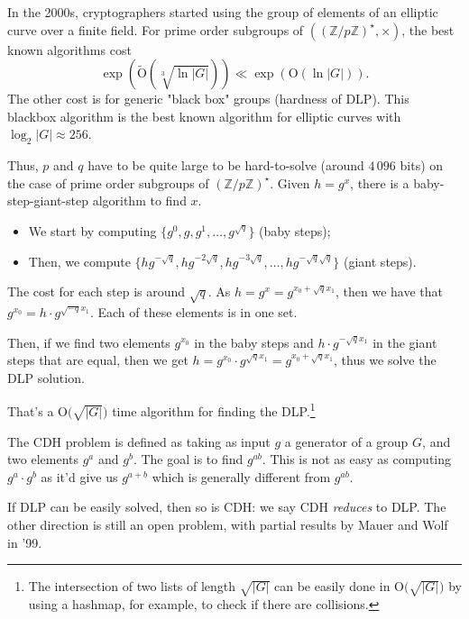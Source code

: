 \documentclass[./main]{subfiles}
\begin{document}
  In the 2000s, cryptographers started using the group of elements of an elliptic curve over a finite field.
  For prime order subgroups of $((\mathds{Z} / p \mathds{Z})^\star, \times )$, the best known algorithms cost 
  \[
    \exp(\tilde{\mathrm{O}}(\sqrt[3]{\ln |G|} )) \ll \exp(\mathrm{O}(\ln |G|))
  .\]
  The other cost is for generic "black box" groups (hardness of DLP).
  This blackbox algorithm is the best known algorithm for elliptic curves with $\log_2 |G| \approx 256$.

  Thus, $p$ and $q$ have to be quite large to be hard-to-solve (around $4\,096$ bits) on the case of prime order subgroups of $(\mathds{Z} / p \mathds{Z})^\star$.
  Given $h = g^x$, there is a baby-step-giant-step algorithm to find $x$.
  \begin{itemize}
    \item We start by computing $\{g^0, g, g^1, \ldots, g^{\sqrt{q}}\} $ (baby steps);
    \item Then, we compute $\{h g^{-\sqrt{q}},  hg^{-2\sqrt{q}}, hg^{-3\sqrt{q}}, \ldots, hg^{-\sqrt{q} \sqrt{q} }\} $ (giant steps).
  \end{itemize}
  The cost for each step is around $\sqrt{q}$.
  As $h = g^x = g^{x_0 + \sqrt{q} x_1}$, then we have that $g^{x_0} = h \cdot g^{\sqrt{-q} x_1}$.
  Each of these elements is in one set.

  Then, if we find two elements $g^{x_0}$ in the baby steps and $h \cdot g^{-\sqrt{q} x_1}$ in the giant steps that are equal, then we get $h = g^{x_0} \cdot g^{\sqrt{q} x_1} = g^{x_0 + \sqrt{q} x_1}$, thus we solve the DLP solution.

  That's a $\mathrm{O}\big(\sqrt{|G|}\big)$ time algorithm for finding the DLP.\footnote{The intersection of two lists of length $\sqrt{|G|}$ can be easily done in $\mathrm{O}\big(\sqrt{|G|}\big)$ by using a hashmap, for example, to check if there are collisions.}\showfootnote

  \begin{defn}
    The CDH problem is defined as taking as input $g$ a generator of a group $G$, and two elements $g^a$ and  $g^b$.
    The goal is to find $g^{ab}$.
    This is not as easy as computing $g^a \cdot g^b$ as it'd give us $g^{a+b}$ which is generally different from $g^{ab}$.
  \end{defn}

  If DLP can be easily solved, then so is CDH: we say CDH \textit{reduces} to DLP.
  The other direction is still an open problem, with partial results by Mauer and Wolf in '99.
\end{document}
